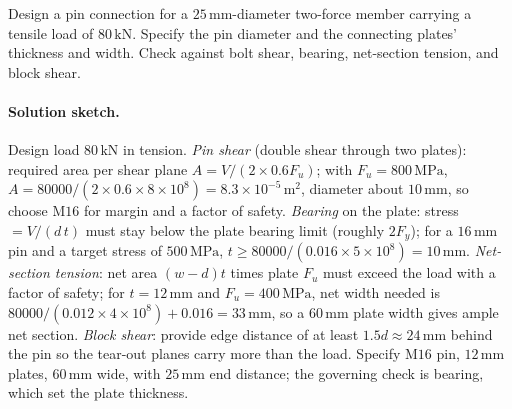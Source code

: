 \begin{exercise}
Design a pin connection for a $25\,\si{\milli\meter}$-diameter
two-force member carrying a tensile load of $80\,\text{kN}$. Specify
the pin diameter and the connecting plates' thickness and width.
Check against bolt shear, bearing, net-section tension, and block
shear.

\paragraph{Solution sketch.} Design load $80\,\text{kN}$ in tension.
\emph{Pin shear} (double shear through two plates): required area per
shear plane $A = V/(2 \times 0.6 F_u)$; with $F_u = 800\,\text{MPa}$,
$A = 80000/(2 \times 0.6 \times 8 \times 10^{8}) = 8.3 \times 10^{-5}\,
\si{\meter\squared}$, diameter about $10\,\si{\milli\meter}$, so choose
$\text{M16}$ for margin and a factor of safety. \emph{Bearing} on the
plate: stress $= V/(d\,t)$ must stay below the plate bearing limit
(roughly $2 F_y$); for a $16\,\si{\milli\meter}$ pin and a target stress
of $500\,\text{MPa}$, $t \geq 80000/(0.016 \times 5 \times 10^{8})
= 10\,\si{\milli\meter}$. \emph{Net-section tension}: net area
$(w - d)t$ times plate $F_u$ must exceed the load with a factor of
safety; for $t = 12\,\si{\milli\meter}$ and $F_u = 400\,\text{MPa}$,
net width needed is $80000/(0.012 \times 4 \times 10^{8}) +
0.016 = 33\,\si{\milli\meter}$, so a $60\,\si{\milli\meter}$ plate width
gives ample net section. \emph{Block shear}: provide edge distance of at
least $1.5d \approx 24\,\si{\milli\meter}$ behind the pin so the
tear-out planes carry more than the load. Specify $\text{M16}$ pin,
$12\,\si{\milli\meter}$ plates, $60\,\si{\milli\meter}$ wide, with
$25\,\si{\milli\meter}$ end distance; the governing check is bearing,
which set the plate thickness.
\end{exercise}

